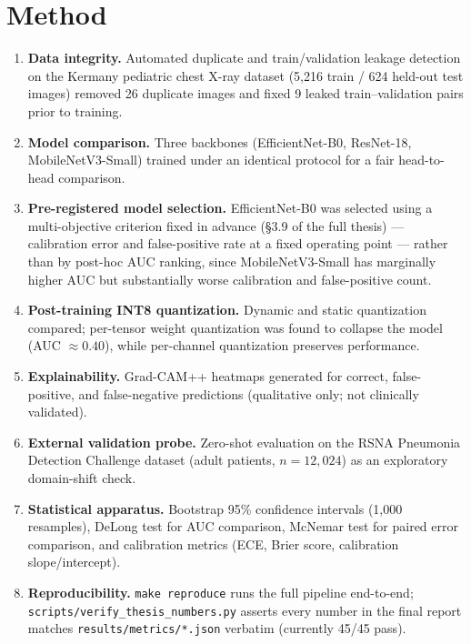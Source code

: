 \documentclass[11pt]{article}
\begin{document}
\section*{Method}
\begin{enumerate}[leftmargin=1.4em]
  \item \textbf{Data integrity.} Automated duplicate and train/validation
        leakage detection on the Kermany pediatric chest X-ray dataset
        (5{,}216 train / 624 held-out test images) removed 26 duplicate
        images and fixed 9 leaked train--validation pairs prior to training.
  \item \textbf{Model comparison.} Three backbones (EfficientNet-B0,
        ResNet-18, MobileNetV3-Small) trained under an identical protocol
        for a fair head-to-head comparison.
  \item \textbf{Pre-registered model selection.} EfficientNet-B0 was
        selected using a multi-objective criterion fixed in advance
        (\S3.9 of the full thesis) --- calibration error and false-positive
        rate at a fixed operating point --- rather than by post-hoc AUC
        ranking, since MobileNetV3-Small has marginally higher AUC but
        substantially worse calibration and false-positive count.
  \item \textbf{Post-training INT8 quantization.} Dynamic and static
        quantization compared; per-tensor weight quantization was found to
        collapse the model (AUC $\approx 0.40$), while per-channel
        quantization preserves performance.
  \item \textbf{Explainability.} Grad-CAM++ heatmaps generated for correct,
        false-positive, and false-negative predictions (qualitative only;
        not clinically validated).
  \item \textbf{External validation probe.} Zero-shot evaluation on the
        RSNA Pneumonia Detection Challenge dataset (adult patients, $n=12{,}024$)
        as an exploratory domain-shift check.
  \item \textbf{Statistical apparatus.} Bootstrap 95\% confidence intervals
        (1{,}000 resamples), DeLong test for AUC comparison, McNemar test
        for paired error comparison, and calibration metrics (ECE, Brier
        score, calibration slope/intercept).
  \item \textbf{Reproducibility.} \texttt{make reproduce} runs the full
        pipeline end-to-end; \texttt{scripts/verify\_thesis\_numbers.py}
        asserts every number in the final report matches
        \texttt{results/metrics/*.json} verbatim (currently 45/45 pass).
\end{enumerate}
\end{document}
